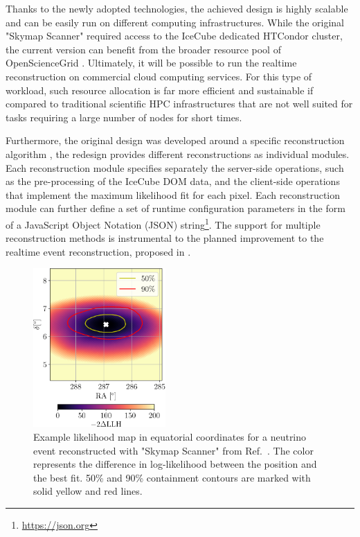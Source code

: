 \documentclass[a4paper,11pt]{article}
\begin{document}
Thanks to the newly adopted technologies, the achieved design is highly scalable and can be easily run on different computing infrastructures. While the original "Skymap Scanner" required access to the IceCube dedicated HTCondor cluster, the current version can benefit from the broader resource pool of OpenScienceGrid \cite{OSG}. Ultimately, it will be possible to run the realtime reconstruction on commercial cloud computing services. For this type of workload, such resource allocation is far more efficient and sustainable if compared to traditional scientific HPC infrastructures that are not well suited for tasks requiring a large number of nodes for short times.

Furthermore, the original design was developed around a specific reconstruction algorithm \cite{IceCube:2013dkx}, the redesign provides different reconstructions as individual modules. Each reconstruction module specifies separately the server-side operations, such as the pre-processing of the IceCube DOM data, and the client-side operations that implement the maximum likelihood fit for each pixel. Each reconstruction module can further define a set of runtime configuration parameters in the form of a JavaScript Object Notation (JSON) string\footnote{\url{https://json.org}}. The support for multiple reconstruction methods is instrumental to the planned improvement to the realtime event reconstruction, proposed in \cite{IceCube:2023icrc-RTRECO}.

\begin{figure}
    \centering
    \includegraphics[width=0.45\textwidth]{figures/scan-example-cropped.pdf}
    \centering
    \caption{Example likelihood map in equatorial coordinates for a neutrino event reconstructed with "Skymap Scanner" from Ref.~\cite{IceCube:2023agq}. The color represents the difference in log-likelihood between the position and the best fit. 50\% and 90\% containment contours are marked with solid yellow and red lines.}
    \label{fig:scan-example}
\end{figure}
\end{document}

